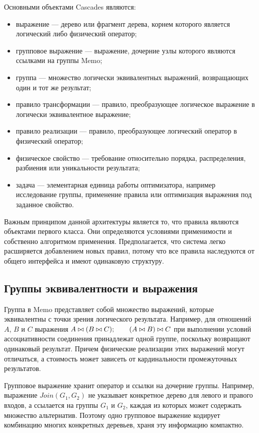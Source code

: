 \documentclass[fontsize=14pt, russian]{scrartcl}
\begin{document}
Основными объектами Cascades являются:

\begin{itemize}
  \item выражение --- дерево или фрагмент дерева, корнем которого является
        логический либо физический оператор;
  \item групповое выражение --- выражение, дочерние узлы которого являются
        ссылками на группы Memo;
  \item группа --- множество логически эквивалентных выражений, возвращающих
        один и тот же результат;
  \item правило трансформации --- правило, преобразующее логическое выражение в
        логически эквивалентное выражение;
  \item правило реализации --- правило, преобразующее логический оператор в
        физический оператор;
  \item физическое свойство --- требование относительно порядка, распределения,
        разбиения или уникальности результата;
  \item задача --- элементарная единица работы оптимизатора, например
        исследование группы, применение правила или оптимизация выражения под
        заданное свойство.
\end{itemize}

Важным принципом данной архитектуры является то, что правила являются объектами
первого класса. Они определяются условиями применимости и собственно алгоритмом
применения. Предполагается, что система легко расширяется добавлением новых
правил, потому что все правила наследуются от общего интерфейса и имеют
одинаковую структуру.

\subsection{Группы эквивалентности и выражения}

Группа в Memo представляет собой множество выражений, которые эквивалентны с
точки зрения логического результата. Например, для отношений \(A\), \(B\) и
\(C\) выражения \( A \bowtie (B \bowtie C) ; \qquad{} (A \bowtie B) \bowtie C \)
при выполнении условий ассоциативности соединения принадлежат одной группе,
поскольку возвращают одинаковый результат. Причем физические реализации этих
выражений могут отличаться, а стоимость может зависеть от кардинальности
промежуточных результатов.

Групповое выражение хранит оператор и ссылки на дочерние группы. Например,
выражение \(Join(G_1, G_2)\) не указывает конкретное дерево для левого и правого
входов, а ссылается на группы \(G_1\) и \(G_2\), каждая из которых может
содержать множество альтернатив. Поэтому одно групповое выражение кодирует
комбинацию многих конкретных деревьев, храня эту информацию компактно.
\end{document}
